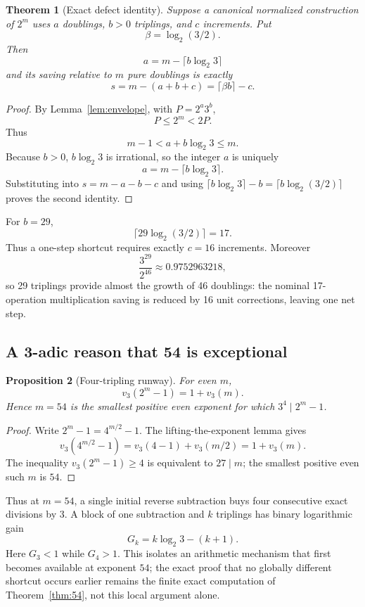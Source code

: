\documentclass[11pt]{article}
\newtheorem{theorem}{Theorem}[section]
\newtheorem{proposition}[theorem]{Proposition}
\begin{document}
\begin{theorem}[Exact defect identity]\label{thm:defectidentity}
Suppose a canonical normalized construction of $2^m$ uses $a$ doublings, $b>0$ triplings, and $c$ increments. Put
\[
 \beta=\log_2(3/2).
\]
Then
\[
 \boxed{a=m-\lceil b\log_2 3\rceil}
\]
and its saving relative to $m$ pure doublings is exactly
\[
 \boxed{s=m-(a+b+c)=\lceil\beta b\rceil-c.}
\]
\end{theorem}
\begin{proof}
By Lemma~\ref{lem:envelope}, with $P=2^a3^b$,
\[
 P\le2^m<2P.
\]
Thus
\[
 m-1<a+b\log_2 3\le m.
\]
Because $b>0$, $b\log_2 3$ is irrational, so the integer $a$ is uniquely
\[
 a=m-\lceil b\log_2 3\rceil.
\]
Substituting into $s=m-a-b-c$ and using $\lceil b\log_2 3\rceil-b=\lceil b\log_2(3/2)\rceil$ proves the second identity.
\end{proof}

For $b=29$,
\[
 \lceil29\log_2(3/2)\rceil=17.
\]
Thus a one-step shortcut requires exactly $c=16$ increments. Moreover
\[
 \frac{3^{29}}{2^{46}}\approx0.9752963218,
\]
so 29 triplings provide almost the growth of 46 doublings: the nominal 17-operation multiplication saving is reduced by 16 unit corrections, leaving one net step.

\subsection{A 3-adic reason that 54 is exceptional}
\begin{proposition}[Four-tripling runway]\label{prop:runway}
For even $m$,
\[
 v_3(2^m-1)=1+v_3(m).
\]
Hence $m=54$ is the smallest positive even exponent for which $3^4\mid2^m-1$.
\end{proposition}
\begin{proof}
Write $2^m-1=4^{m/2}-1$. The lifting-the-exponent lemma gives
\[
 v_3(4^{m/2}-1)=v_3(4-1)+v_3(m/2)=1+v_3(m).
\]
The inequality $v_3(2^m-1)\ge4$ is equivalent to $27\mid m$; the smallest positive even such $m$ is $54$.
\end{proof}
Thus at $m=54$, a single initial reverse subtraction buys four consecutive exact divisions by $3$. A block of one subtraction and $k$ triplings has binary logarithmic gain
\[
 G_k=k\log_2 3-(k+1).
\]
Here $G_3<1$ while $G_4>1$. This isolates an arithmetic mechanism that first becomes available at exponent $54$; the exact proof that no globally different shortcut occurs earlier remains the finite exact computation of Theorem~\ref{thm:54}, not this local argument alone.
\end{document}
